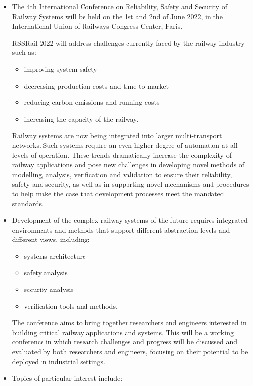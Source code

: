 \documentclass[prodmode,acmtecs]{acmsmall} %
\begin{document}
\begin{itemize}\item  The 4th International Conference on Reliability, Safety and Security of Railway Systems will be held on the 1st and 2nd of June 2022, in the International Union of Railways Congress Center, Paris. 
 
  RSSRail 2022 will address challenges currently faced by the railway industry such as: 
 
\begin{itemize}\item  improving system safety
\item  decreasing production costs and time to market
\item  reducing carbon emissions and running costs
\item  increasing the capacity of the railway.
\end{itemize} 
  Railway systems are now being integrated into larger multi-transport networks. Such systems require an even higher degree of automation at all levels of operation. These trends dramatically increase the complexity of railway applications and pose new challenges in developing novel methods of modelling, analysis, verification and validation to ensure their reliability, safety and security, as well as in supporting novel mechanisms and procedures to help make the case that development processes meet the mandated standards.  
 
\item  Development of the complex railway systems of the future requires integrated  environments and methods that support different abstraction levels and  different views, including:  
 
\begin{itemize}\item  systems architecture 
\item  safety analysis 
\item  security analysis 
\item  verification tools and methods. 
\end{itemize} 
  The conference aims to bring together researchers and engineers interested  in building critical railway applications and systems. This will be a working  conference in which research challenges and progress will be discussed and  evaluated by both researchers and engineers, focusing on their potential  to be deployed in industrial settings.  
 
\item  Topics of particular interest include:  
 

\end{itemize}
\end{document}
